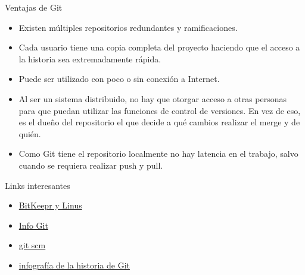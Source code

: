 \documentclass{beamer}
\begin{document}
\begin{frame}{Ventajas de Git}
	\begin{itemize}
		\item Existen múltiples repositorios redundantes y ramificaciones.
		\item Cada usuario tiene una copia completa del proyecto haciendo que el acceso a la historia sea extremadamente rápida.
		\item Puede ser utilizado con poco o sin conexión a Internet.
		\item Al ser un sistema distribuido, no hay que otorgar acceso a otras personas para que puedan utilizar las funciones de control de versiones. En vez de eso, es el dueño del repositorio el que decide a qué cambios realizar el merge y de quién.
		\item Como Git tiene el repositorio localmente no hay latencia en el trabajo, salvo cuando se requiera
		realizar push y pull.
	\end{itemize}
\end{frame}

\begin{frame}[plain]{Links interesantes}
	\begin{itemize}
		\item \href{https://www.infoworld.com/article/2670360/linus-torvalds--bitkeeper-blunder.html}{BitKeepr y Linus}
		\item \href{https://www.conasa.es/blog/git-10-anos-controlando-versiones/}{Info Git}
		\item \href{https://git-scm.com}{git scm}
		\item \href{https://www.atlassian.com/git/articles/10-years-of-git}{infografía de la historia de Git}		
	\end{itemize}	
\end{frame}
\end{document}
